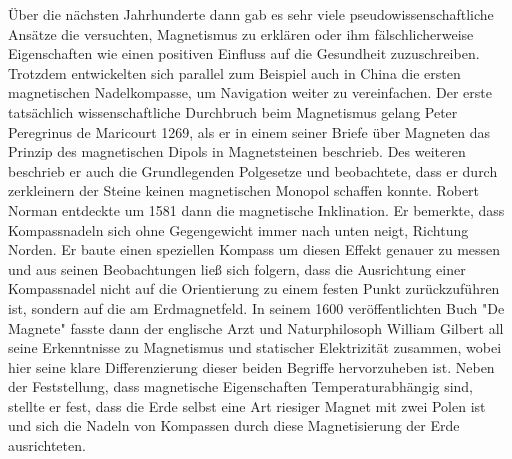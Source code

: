 \documentclass[12pt, a4paper]{article}
\begin{document}
	Über die nächsten Jahrhunderte dann gab es sehr viele pseudowissenschaftliche Ansätze die versuchten, Magnetismus zu erklären oder ihm fälschlicherweise Eigenschaften wie einen positiven Einfluss auf die Gesundheit zuzuschreiben. Trotzdem entwickelten sich parallel zum Beispiel auch in China die ersten magnetischen Nadelkompasse, um Navigation weiter zu vereinfachen\cite{metioui22}.\newline
	Der erste tatsächlich wissenschaftliche Durchbruch beim Magnetismus gelang Peter Peregrinus de Maricourt 1269, als er in einem seiner Briefe über Magneten das Prinzip des magnetischen Dipols in Magnetsteinen beschrieb. Des weiteren beschrieb er auch die Grundlegenden Polgesetze und beobachtete, dass er durch zerkleinern der Steine keinen magnetischen Monopol schaffen konnte\cite{metioui22}.\newline
	Robert Norman entdeckte um 1581 dann die magnetische Inklination. Er bemerkte, dass Kompassnadeln sich ohne Gegengewicht immer nach unten neigt, Richtung Norden. Er baute einen speziellen Kompass um diesen Effekt genauer zu messen und aus seinen Beobachtungen ließ sich folgern, dass die Ausrichtung einer Kompassnadel nicht auf die Orientierung zu einem festen Punkt zurückzuführen ist, sondern auf die am Erdmagnetfeld\cite{metioui22}.\newline
	In seinem 1600 veröffentlichten Buch "De Magnete" fasste dann der englische Arzt und Naturphilosoph William Gilbert all seine Erkenntnisse zu Magnetismus und statischer Elektrizität zusammen, wobei hier seine klare Differenzierung dieser beiden Begriffe hervorzuheben ist. Neben der Feststellung, dass magnetische Eigenschaften Temperaturabhängig sind, stellte er fest, dass die Erde selbst eine Art riesiger Magnet mit zwei Polen ist und sich die Nadeln von Kompassen durch diese Magnetisierung der Erde ausrichteten\cite{singh19}.\paragraph{}
	
\end{document}
